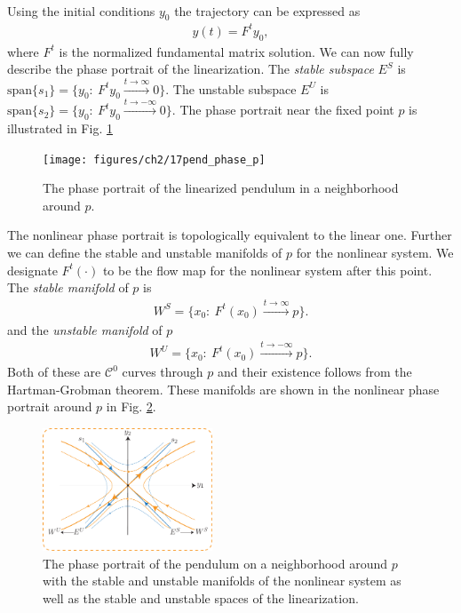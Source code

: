 \begin{ex}
\begin{align}
	\end{align}
	Using the initial conditions $y_0$ the trajectory can be expressed as
	\begin{align}
		y(t) =  F^{t}{y_0}, 
	\end{align}
	where $F^{t}$ is the normalized fundamental matrix solution. We can now fully describe the phase portrait of the linearization. The \emph{stable subspace} $E^{S}$ is $ \textrm{span} \{{s_1} \} = \{{y_0} :\ F^{t}{y_0} \xrightarrow{t \to \infty} 0 \} $. The unstable subspace $E^{U}$ is $ \textrm{span} \{{s_2}\} = \{{y_0} : \ F^{t}{y_0} \xrightarrow{t \to - \infty }0\} $. The phase portrait near the fixed point $p$ is illustrated in Fig. \ref{fig:pend_phase_p}
\begin{figure}[h!]
	\centering
	\texttt{[image: figures/ch2/17pend\_phase\_p]}
	\caption{The phase portrait of the linearized pendulum in a neighborhood around ${p} $.}
	\label{fig:pend_phase_p}
\end{figure}

The nonlinear phase portrait is topologically equivalent to the linear one. Further we can define the stable and unstable manifolds of ${p} $ for the nonlinear system. We designate $F^{t}(\cdot)$ to be the flow map for the nonlinear system after this point.
The \emph{stable manifold} of ${p} $ is 
\begin{align}
	\boxed{
	W^{S} = \{ {x_0} :\ F^{t}({x_0} ) \xrightarrow{t \to \infty}{p} \}.
}
\end{align}
and the \emph{unstable manifold} of ${p} $
\begin{align}
	\boxed{
	W^{U}=\{{x_0} :\ F^{t}({x_0} ) \xrightarrow{t \to - \infty}{p}\}.
}
\end{align}
Both of these are $\mathcal{C}^{0}$ curves through ${p}$ and their existence follows from the Hartman-Grobman theorem. These manifolds are shown in the nonlinear phase portrait around ${p} $ in Fig. \ref{fig:nonlin_pend_phase_p}. 
\begin{figure}[h!]
	\centering
	\includegraphics[width=0.45\textwidth]{figures/ch2/18nonlin_pend_phase_p.pdf}
	\caption{The phase portrait of the pendulum on a neighborhood around ${p} $ with the stable and unstable manifolds of the nonlinear system as well as the stable and unstable spaces of the linearization.}
	\label{fig:nonlin_pend_phase_p}
\end{figure}


\end{ex}
